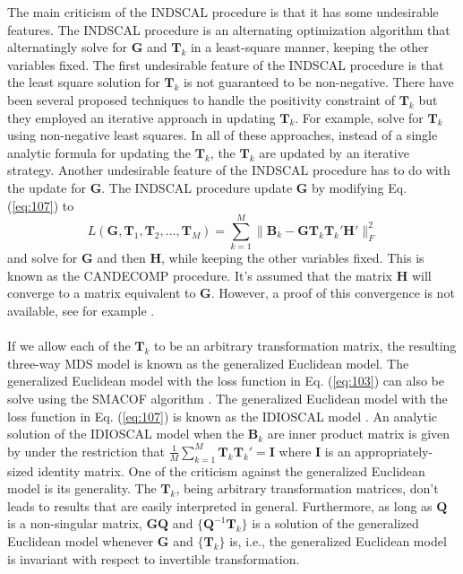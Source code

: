 \noindent The main criticism of the INDSCAL procedure is that it has
some undesirable features. The INDSCAL procedure is an alternating
optimization algorithm that alternatingly solve for $\mathbf{G}$ and
$\mathbf{T}_k$ in a least-square manner, keeping the other variables
fixed. The first undesirable feature of the INDSCAL procedure is that
the least square solution for $\mathbf{T}_k$ is not guaranteed to be
non-negative. There have been several proposed techniques to handle
the positivity constraint of $\mathbf{T}_k$ but they employed an
iterative approach in updating $\mathbf{T}_k$. For example,
\citet{berge93:_comput_indsc} solve for $\mathbf{T}_k$ using
non-negative least squares. In all of these approaches, instead of a
single analytic formula for updating the $\mathbf{T}_k$, the
$\mathbf{T}_k$ are updated by an iterative strategy. Another
undesirable feature of the INDSCAL procedure has to do with the update
for $\mathbf{G}$. The INDSCAL procedure update $\mathbf{G}$ by
modifying Eq. (\ref{eq:107}) to
\begin{equation}
  \label{eq:108}
  L(\mathbf{G}, \mathbf{T}_1, \mathbf{T}_2, \dots, \mathbf{T}_M)
  = \sum_{k = 1}^{M}\| \mathbf{B}_k -
  \mathbf{G}\mathbf{T}_k \mathbf{T}_k' \mathbf{H}' \|_F^2 
\end{equation}
and solve for $\mathbf{G}$ and then $\mathbf{H}$, while keeping the
other variables fixed. This is known as the CANDECOMP procedure.  It's
assumed that the matrix $\mathbf{H}$ will converge to a matrix
equivalent to $\mathbf{G}$. However, a proof of this convergence is
not available, see for example \citet{berge91:_some_candec_indsc}.  \\
\\

\noindent If we allow each of the $\mathbf{T}_k$ to be an arbitrary
transformation matrix, the resulting three-way MDS model is known as
the generalized Euclidean model. The generalized Euclidean model with
the loss function in Eq. (\ref{eq:103}) can also be solve using the
SMACOF algorithm \citet{leeuw80:_multiv}. The generalized Euclidean
model with the loss function in Eq. (\ref{eq:107}) is known as the
IDIOSCAL model \citet{carroll74:_contem}. An analytic solution of the
IDIOSCAL model when the $\mathbf{B}_k$ are inner
product matrix is given by \citet{schonemann72} under the restriction
that $\tfrac{1}{M}\sum_{k=1}^{M}{\mathbf{T}_k \mathbf{T}_k'} =
\mathbf{I}$ where $\mathbf{I}$ is an appropriately-sized identity
matrix. One of the criticism against the generalized Euclidean
model is its generality. The $\mathbf{T}_k$, being arbitrary
transformation matrices, don't
leads to results that are easily interpreted in general. Furthermore,
as long as $\mathbf{Q}$ is a non-singular matrix,
$\mathbf{G}\mathbf{Q}$ and $\{\mathbf{Q}^{-1}\mathbf{T}_k\}$ is a solution
of the generalized Euclidean model whenever $\mathbf{G}$ and
$\{\mathbf{T}_k\}$ is, i.e., the generalized Euclidean model is invariant
with respect to invertible transformation. 
